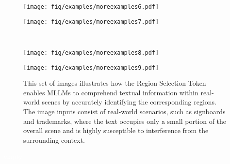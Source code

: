 \begin{figure*}[h]
  \centering
    \begin{minipage}[t]{0.45\textwidth}
        \centering
        \vspace{0pt}
        \texttt{[image: fig/examples/moreexamples6.pdf]}
    \end{minipage}
    \hfill
    \begin{minipage}[t]{0.45\textwidth}
        \centering
        \vspace{0pt}
        \texttt{[image: fig/examples/moreexamples7.pdf]}
    \end{minipage}
    \\
    \begin{minipage}[t]{0.45\textwidth}
        \centering
        \vspace{0pt}
        \texttt{[image: fig/examples/moreexamples8.pdf]}
    \end{minipage}
    \hfill
    \begin{minipage}[t]{0.45\textwidth}
        \centering
        \vspace{0pt}
        \texttt{[image: fig/examples/moreexamples9.pdf]}
    \end{minipage}
   \caption{This set of images illustrates how the Region Selection Token enables MLLMs to comprehend textual information within real-world scenes by accurately identifying the corresponding regions. The image inputs consist of real-world scenarios, such as signboards and trademarks, where the text occupies only a small portion of the overall scene and is highly susceptible to interference from the surrounding context.}
   \label{fig:moreexample:g2}
\end{figure*}
\textcolor{white}{empty}